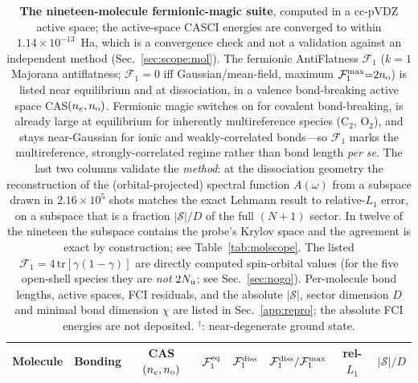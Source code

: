 \begin{table}[tp]\centering\small
\caption{\textbf{The nineteen-molecule fermionic-magic suite}, computed in a cc-pVDZ
active space; the active-space CASCI energies are converged to within $1.14\times10^{-13}$~Ha, which is a
convergence check and not a validation against an independent method (Sec.~\ref{sec:scope:mol}). The fermionic
AntiFlatness $\mathcal F_1$ ($k{=}1$ Majorana antiflatness; $\mathcal F_1{=}0$ iff Gaussian/mean-field, maximum
$\mathcal F_1^{\max}{=}2n_{\rm o}$) is listed near equilibrium and at dissociation, in a valence
bond-breaking active space CAS$(n_e,n_{\rm o})$. Fermionic magic switches on for covalent
bond-breaking, is already large at equilibrium for inherently multireference species
($\mathrm{C_2}$, $\mathrm{O_2}$), and stays near-Gaussian for ionic and weakly-correlated
bonds---so $\mathcal F_1$ marks the multireference, strongly-correlated regime rather than bond length
\emph{per se}. The last two columns validate the \emph{method}: at the dissociation geometry the
reconstruction of the (orbital-projected) spectral function $A(\omega)$ from a subspace drawn in
$2.16\times10^{5}$ shots matches the exact Lehmann result to relative-$L_1$ error, on a subspace that
is a fraction $|\mathcal{S}|/D$ of the full $(N{+}1)$ sector. In twelve of the nineteen the subspace contains the probe's Krylov space and the agreement is exact by construction; see
Table~\ref{tab:molscope}. The listed $\mathcal F_1=4\,\mathrm{tr}[\gamma(1-\gamma)]$
are directly computed spin-orbital values (for the five open-shell species they are \emph{not} $2N_{\rm u}$;
see Sec.~\ref{sec:nogo}). Per-molecule bond lengths, active spaces, FCI residuals, and the
absolute $|\mathcal S|$, sector dimension $D$ and minimal bond dimension $\chi$ are listed in
Sec.~\ref{app:repro}; the absolute FCI energies are not deposited. $^{\dagger}$: near-degenerate ground state.}
\label{tab:molecules}
\begin{tabular}{llcccccc}\hline\hline
Molecule & Bonding & CAS$(n_e,n_{\rm o})$ & $\mathcal F_1^{\rm eq}$ & $\mathcal F_1^{\rm diss}$ & $\mathcal F_1^{\rm diss}/\mathcal F_1^{\max}$ & rel-$L_1$ & $|\mathcal{S}|/D$ \\ \hline

\end{tabular}
\end{table}
